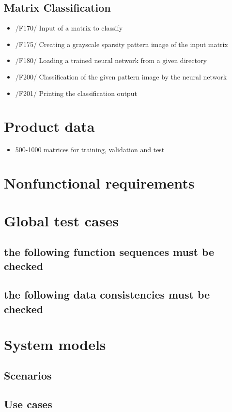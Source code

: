 \documentclass[parskip=full]{scrartcl}
\begin{document}
\subsection{Matrix Classification}
	\begin{itemize}
	\item /F170/ Input of a matrix to classify
	\item /F175/ Creating a grayscale sparsity pattern image of the input matrix
	\item /F180/ Loading a trained neural network from a given directory
	\item /F200/ Classification of the given pattern image by the neural network
	\item /F201/ Printing the classification output
	\end{itemize}

\section{Product data}
\begin{itemize}
\item 500-1000 matrices for training, validation and test
\end{itemize}

\section{Nonfunctional requirements}

\section{Global test cases}
\subsection{the following function sequences must be checked}
\subsection{the following data consistencies must be checked}

\section{System models}
\subsection{Scenarios}
\subsection{Use cases}
\end{document}
